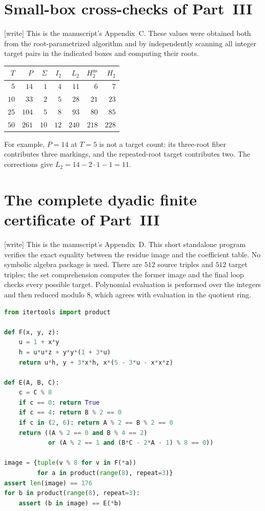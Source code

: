 \documentclass[11pt]{article}
\numberwithin{equation}{section}
\theoremstyle{plain}
\theoremstyle{plain}
\theoremstyle{plain}
\theoremstyle{definition}
\theoremstyle{definition}
\theoremstyle{definition}
\theoremstyle{remark}
\newcommand{\wtag}{\textup{[write]}}%
\newcommand{\NS}{\mathrm{ns}}\newcommand{\spc}{\mathrm{sp}}
\begin{document}
\section{Small-box cross-checks of Part~III}\label{alg:ns:app:small}
\wtag{} This is the manuscript's Appendix~C.
These values were obtained both from the root-parametrized algorithm
and by independently scanning all integer target pairs in the indicated
boxes and computing their roots.
\begin{center}\small
\begin{tabular}{@{}r r r r r r r@{}}
\toprule
$T$ & $P$ & $\Sigma$ & $I_2$ & $L_2$ & $H_2^{\NS}$ & $H_2$\\
\midrule
$5$ & $14$ & $1$ & $4$ & $11$ & $6$ & $7$\\
$10$ & $33$ & $2$ & $5$ & $28$ & $21$ & $23$\\
$25$ & $104$ & $5$ & $8$ & $93$ & $80$ & $85$\\
$50$ & $261$ & $10$ & $12$ & $240$ & $218$ & $228$\\
\bottomrule
\end{tabular}
\end{center}
For example, $P=14$ at $T=5$ is not a target count: its three-root
fiber contributes three markings, and the repeated-root target
contributes two. The corrections give $L_2=14-2\cdot1-1=11$.

\section{The complete dyadic finite certificate of Part~III}\label{alg:ns:app:dyadic}
\wtag{} This is the manuscript's Appendix~D.
This short standalone program verifies the exact equality between the
residue image and the coefficient table. No symbolic algebra package is
used. There are $512$ source triples and $512$ target triples; the set
comprehension computes the former image and the final loop checks every
possible target. Polynomial evaluation is performed over the integers
and then reduced modulo $8$, which agrees with evaluation in the quotient
ring.

\begin{lstlisting}[language=Python]
from itertools import product

def F(x, y, z):
    u = 1 + x*y
    h = u*u*z + y*y*(1 + 3*u)
    return u*h, y + 3*x*h, x*(5 - 3*u - x*x*z)

def E(A, B, C):
    c = C % 8
    if c == 0: return True
    if c == 4: return B % 2 == 0
    if c in (2, 6): return A % 2 == B % 2 == 0
    return ((A % 2 == 0 and B % 4 == 2)
            or (A % 2 == 1 and (B*C - 2*A - 1) % 8 == 0))

image = {tuple(v % 8 for v in F(*a))
         for a in product(range(8), repeat=3)}
assert len(image) == 176
for b in product(range(8), repeat=3):
    assert (b in image) == E(*b)
\end{lstlisting}
\end{document}
